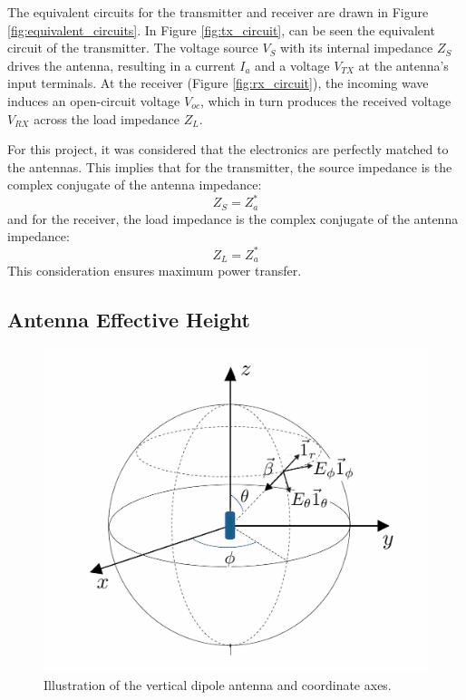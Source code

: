 The equivalent circuits for the transmitter and receiver are drawn in Figure \ref{fig:equivalent_circuits}. In Figure \ref{fig:tx_circuit}, can be seen the equivalent circuit of the transmitter. The voltage source $V_S$ with its internal impedance $Z_S$ drives the antenna, resulting in a current $I_a$ and a voltage $V_{TX}$ at the antenna's input terminals. At the receiver (Figure \ref{fig:rx_circuit}), the incoming wave induces an open-circuit voltage $V_{oc}$, which in turn produces the received voltage $V_{RX}$ across the load impedance $Z_L$.

For this project, it was considered that the electronics are perfectly matched to the antennas. This implies that for the transmitter, the source impedance is the complex conjugate of the antenna impedance:
\begin{equation}
	Z_S = Z_a^*
\end{equation}
\vspace{0.5em}
and for the receiver, the load impedance is the complex conjugate of the antenna impedance:
\begin{equation}
	Z_L = Z_a^*
\end{equation}
\vspace{0.5em}
This consideration ensures maximum power transfer.

\subsection{Antenna Effective Height}
\begin{figure}[H]
	\centering
	\includegraphics[width=0.5\linewidth]{content/4-images/axes.png}
	\caption{Illustration of the vertical dipole antenna and coordinate axes.}
	\label{fig:axes}
\end{figure}

